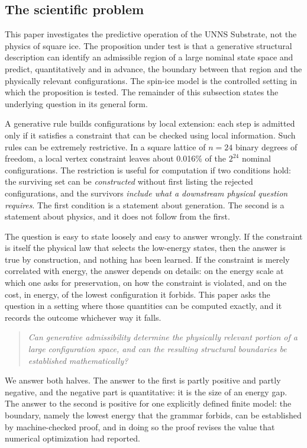\documentclass[11pt,a4paper]{article}
\theoremstyle{plain}
\theoremstyle{definition}
\theoremstyle{remark}
\begin{document}
\subsection{The scientific problem}
This paper investigates the predictive operation of the UNNS Substrate, not the physics of square ice. The proposition under test is that a generative structural description can identify an admissible region of a large nominal state space and predict, quantitatively and in advance, the boundary between that region and the physically relevant configurations. The spin-ice model is the controlled setting in which the proposition is tested. The remainder of this subsection states the underlying question in its general form.

A generative rule builds configurations by local extension: each step is admitted only if it satisfies a constraint that can be checked using local information. Such rules can be extremely restrictive. In a square lattice of $n=24$ binary degrees of freedom, a local vertex constraint leaves about 0.016\% of the $2^{24}$ nominal configurations. The restriction is useful for computation if two conditions hold: the surviving set can be \emph{constructed} without first listing the rejected configurations, and the survivors \emph{include what a downstream physical question requires}. The first condition is a statement about generation. The second is a statement about physics, and it does not follow from the first.

The question is easy to state loosely and easy to answer wrongly. If the constraint is itself the physical law that selects the low-energy states, then the answer is true by construction, and nothing has been learned. If the constraint is merely correlated with energy, the answer depends on details: on the energy scale at which one asks for preservation, on how the constraint is violated, and on the cost, in energy, of the lowest configuration it forbids. This paper asks the question in a setting where those quantities can be computed exactly, and it records the outcome whichever way it falls.

\begin{quote}\itshape
Can generative admissibility determine the physically relevant portion of a large configuration space, and can the resulting structural boundaries be established mathematically?
\end{quote}

We answer both halves. The answer to the first is partly positive and partly negative, and the negative part is quantitative: it is the size of an energy gap. The answer to the second is positive for one explicitly defined finite model: the boundary, namely the lowest energy that the grammar forbids, can be established by machine-checked proof, and in doing so the proof revises the value that numerical optimization had reported.
\end{document}
